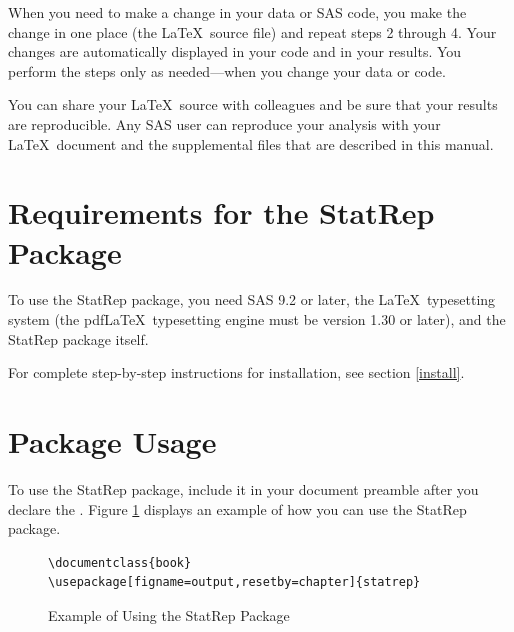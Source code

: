 \documentclass[article,oneside]{memoir}
\newcommand*{\StatRep}{\textsf{StatRep}\xspace}
\begin{document}
When you need to make a change in your data or SAS code, you make the change in
one place (the \LaTeX\ source file) and repeat steps 2 through 4.
Your changes are automatically displayed in your code and in your results.
You perform the steps only as needed---when you change your data or code.

You can share your \LaTeX\ source with colleagues and be sure that your results
are reproducible. Any SAS user can reproduce your analysis with your \LaTeX\ document
and the supplemental files that are described in this manual.

\section{Requirements for the \StatRep Package}
To use the \StatRep package, you need SAS 9.2 or later,
the \LaTeX\ typesetting system
(the  pdf\LaTeX\ typesetting engine must be version 1.30 or later), and the \StatRep package itself.

For complete step-by-step instructions for installation, see section \ref{install}.
\section{Package Usage}
  To use the \StatRep package, include it in your document preamble after you
  declare the .
  Figure \ref{fig:usage} displays an example of how you can use the \StatRep package.

\begin{figure}[H]
\begin{shaded}
\begin{verbatim}
\documentclass{book}
\usepackage[figname=output,resetby=chapter]{statrep}
\end{verbatim}%
\end{shaded}
\caption{Example of Using the \StatRep Package}\label{fig:usage}
\end{figure}
\end{document}
